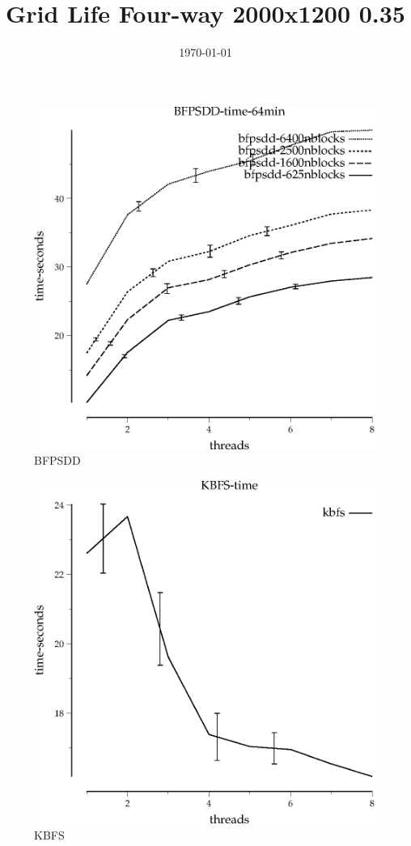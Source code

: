 \documentclass{article}
\title{Grid Life Four-way 2000x1200 0.35}
\date{\today}
\begin{document}
\maketitle

\begin{figure}
\begin{center}
\includegraphics{BFPSDD-time-64min}
\end{center}
\caption{BFPSDD}
\end{figure}


\begin{figure}
\begin{center}
\includegraphics{KBFS-time}
\end{center}
\caption{KBFS}
\end{figure}
\end{document}

